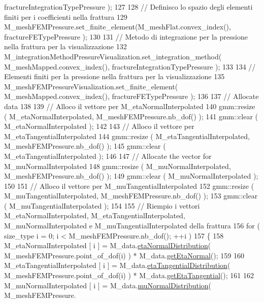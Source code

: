 \begin{DoxyCode}
      fractureIntegrationTypePressure );
127 
128     \textcolor{comment}{// Definisco lo spazio degli elementi finiti per i coefficienti nella frattura}
129     M\_meshFEMPressure.set\_finite\_element(M\_meshFlat.convex\_index(), fractureFETypePressure );
130 
131     \textcolor{comment}{// Metodo di integrazione per la pressione nella frattura per la visualizzazione}
132     M\_integrationMethodPressureVisualization.set\_integration\_method( M\_meshMapped.convex\_index(), 
      fractureIntegrationTypePressure );
133 
134     \textcolor{comment}{// Elementi finiti per la pressione nella frattura per la visualizzazione}
135     M\_meshFEMPressureVisualization.set\_finite\_element( M\_meshMapped.convex\_index(), fractureFETypePressure 
      );
136 
137     \textcolor{comment}{// Allocate data}
138 
139     \textcolor{comment}{// Alloco il vettore per M\_etaNormalInterpolated}
140     gmm::resize ( M\_etaNormalInterpolated, M\_meshFEMPressure.nb\_dof() );
141     gmm::clear ( M\_etaNormalInterpolated );
142 
143     \textcolor{comment}{// Alloco il vettore per M\_etaTangentialInterpolated}
144     gmm::resize ( M\_etaTangentialInterpolated, M\_meshFEMPressure.nb\_dof() );
145     gmm::clear ( M\_etaTangentialInterpolated );
146 
147     \textcolor{comment}{// Allocate the vector for M\_muNormalInterpolated}
148     gmm::resize ( M\_muNormalInterpolated, M\_meshFEMPressure.nb\_dof() );
149     gmm::clear ( M\_muNormalInterpolated );
150 
151     \textcolor{comment}{// Alloco il vettore per M\_muTangentialInterpolated}
152     gmm::resize ( M\_muTangentialInterpolated, M\_meshFEMPressure.nb\_dof() );
153     gmm::clear ( M\_muTangentialInterpolated );
154 
155     \textcolor{comment}{// Riempio i vettori M\_etaNormalInterpolated, M\_etaTangentialInterpolated, M\_muNormalInterpolated e
       M\_muTangentialInterpolated della frattura}
156     \textcolor{keywordflow}{for} ( size\_type i = 0; i < M\_meshFEMPressure.nb\_dof(); ++i )
157     \{
158         M\_etaNormalInterpolated [ i ] = M\_data.\hyperlink{classFractureData_a0aaeeb3d9eedd46175759cd6b9536484}{etaNormalDistribution}( 
      M\_meshFEMPressure.point\_of\_dof(i) ) * M\_data.\hyperlink{classFractureData_a9acc76c77282d4b5d0cdca18c2b1b9ea}{getEtaNormal}();
159 
160         M\_etaTangentialInterpolated [ i ] = M\_data.\hyperlink{classFractureData_a0f989b64832a1f0fc77632c6803f102c}{etaTangentialDistribution}( 
      M\_meshFEMPressure.point\_of\_dof(i) ) * M\_data.\hyperlink{classFractureData_a7378053b4009825b4a2957484cb2a5e8}{getEtaTangential}();
161 
162         M\_muNormalInterpolated [ i ] = M\_data.\hyperlink{classFractureData_a4ae566f9148893e47279097cab215e7b}{muNormalDistribution}( M\_meshFEMPressure.

\end{DoxyCode}
